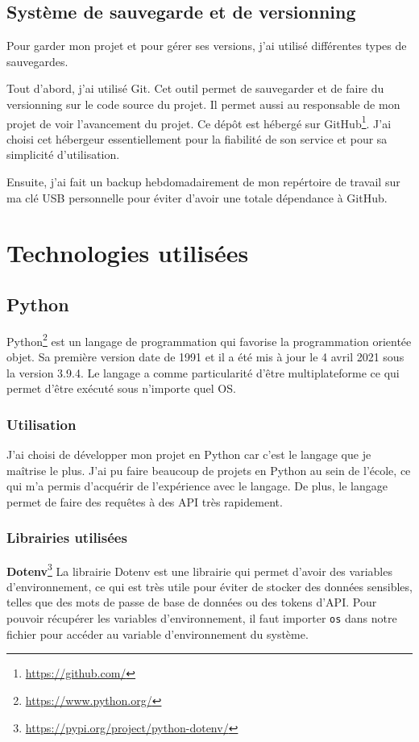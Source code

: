 \documentclass[a4paper,14pt]{extarticle}
\begin{document}
{\subsection{Système de sauvegarde et de versionning}

Pour garder mon projet et pour gérer ses versions, j'ai utilisé différentes types de sauvegardes.

Tout d'abord, j'ai utilisé Git. Cet outil permet de sauvegarder et de faire du versionning sur le code source du projet. Il permet aussi au responsable de mon projet de voir l'avancement du projet. Ce dépôt est hébergé sur GitHub\footnote{\url{https://github.com/}}. J'ai choisi cet hébergeur essentiellement pour la fiabilité de son service et pour sa simplicité d'utilisation. 

Ensuite, j'ai fait un backup hebdomadairement de mon repértoire de travail sur ma clé USB personnelle pour éviter d'avoir une totale dépendance à GitHub. 

\section{Technologies utilisées}

\subsection{Python}
Python\footnote{\url{https://www.python.org/}} est un langage de programmation qui favorise la programmation orientée objet. Sa première version date de 1991 et il a été mis à jour le 4 avril 2021 sous la version 3.9.4. Le langage a comme particularité d'être multiplateforme ce qui permet d'être exécuté sous n'importe quel OS.

\subsubsection{Utilisation}
J'ai choisi de développer mon projet en Python car c'est le langage que je maîtrise le plus. J'ai pu faire beaucoup de projets en Python au sein de l'école, ce qui m'a permis d'acquérir de l'expérience avec le langage. De plus, le langage permet de faire des requêtes à des API très rapidement.

\subsubsection{Librairies utilisées}

\textbf{Dotenv}\footnote{\url{https://pypi.org/project/python-dotenv/}}
La librairie Dotenv est une librairie qui permet d'avoir des variables d'environnement, ce qui est très utile pour éviter de stocker des données sensibles, telles que des mots de passe de base de données ou des tokens d'API. Pour pouvoir récupérer les variables d'environnement, il faut importer \texttt{os} dans notre fichier pour accéder au variable d'environnement du système.

}
\end{document}
